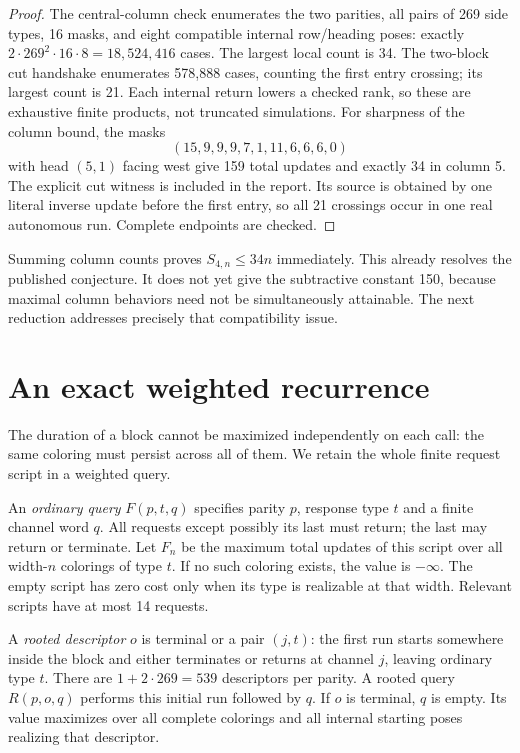 \documentclass[11pt]{article}
\theoremstyle{definition}\newtheorem{definition}[theorem]{Definition}
\newcommand{\minusinf}{-\infty}
\begin{document}
\begin{proof}
The central-column check enumerates the two parities, all pairs of 269 side
types, 16 masks, and eight compatible internal row/heading poses: exactly
$2\cdot269^2\cdot16\cdot8=18,524,416$ cases. The largest local count is 34.
The two-block cut handshake enumerates 578,888 cases, counting the first entry
crossing; its largest count is 21. Each internal return lowers a checked rank,
so these are exhaustive finite products, not truncated simulations.
For sharpness of the column bound, the masks
\[
 (15,9,9,9,7,1,11,6,6,6,0)
\]
with head $(5,1)$ facing west give 159 total updates and exactly 34 in column 5.
The explicit cut witness is included in the report. Its source is obtained by
one literal inverse update before the first entry, so all 21 crossings occur in
one real autonomous run. Complete endpoints are checked.
\end{proof}

Summing column counts proves $S_{4,n}\le34n$ immediately. This already resolves
the published conjecture. It does not yet give the subtractive constant 150,
because maximal column behaviors need not be simultaneously attainable.
The next reduction addresses precisely that compatibility issue.

\section{An exact weighted recurrence}\label{sec:weighted}
The duration of a block cannot be maximized independently on each call: the
same coloring must persist across all of them. We retain the whole finite
request script in a weighted query.

An \emph{ordinary query} $F(p,t,q)$ specifies parity $p$, response type $t$ and
a finite channel word $q$. All requests except possibly its last must return;
the last may return or terminate. Let $F_n$ be the maximum total updates of
this script over all width-$n$ colorings of type $t$. If no such coloring exists,
the value is $\minusinf$. The empty script has zero cost only when its type is
realizable at that width. Relevant scripts have at most 14 requests.

A \emph{rooted descriptor} $o$ is terminal or a pair $(j,t)$: the first run
starts somewhere inside the block and either terminates or returns at channel
$j$, leaving ordinary type $t$. There are $1+2\cdot269=539$ descriptors per
parity. A rooted query $R(p,o,q)$ performs this initial run followed by $q$.
If $o$ is terminal, $q$ is empty. Its value maximizes over all complete colorings
and all internal starting poses realizing that descriptor.
\end{document}
